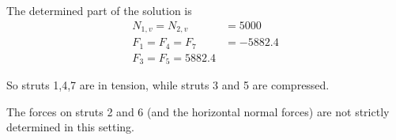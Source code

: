 \begin{applicationActivities}
\begin{observation}
The determined part of the solution is
\begin{align*}
N_{1,v}=N_{2,v}&=5000 \\
F_1=F_4=F_7&=-5882.4 \\
F_3=F_5=5882.4
\end{align*}

So struts 1,4,7 are in tension, while struts 3 and 5 are compressed.

The forces on struts 2 and 6 (and the horizontal normal forces) are not strictly determined in this setting.
\end{observation}

\end{applicationActivities}
